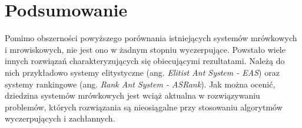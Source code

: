 {    %
    \section{Podsumowanie}
    {
        Pomimo obszerności powyższego porównania istniejących systemów mrówkowych i mrowiskowych, nie jest ono w żadnym
        stopniu wyczerpujące. Powstało wiele innych rozwiązań charakteryzujących się obiecującymi rezultatami. Należą do
        nich przykładowo systemy elitystyczne (ang. \textit{Elitist Ant System - EAS})\cite{Dorigo1996AntSO} oraz
        systemy rankingowe (ang. \textit{Rank Ant System - ASRank})\cite{Bullnheimer1997ANR}. Jak można ocenić,
        dziedzina systemów mrówkowych jest wciąż aktualna w rozwiązywaniu problemów, których rozwiązania są nieosiągalne
        przy stosowaniu algorytmów wyczerpujących i zachłannych\cite{Dorigo2003TheAC}.
    }
}





